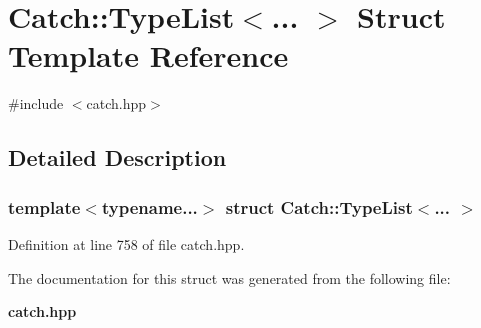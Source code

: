 \section{Catch\+::Type\+List$<$... $>$ Struct Template Reference}
\label{struct_catch_1_1_type_list}


{\ttfamily \#include $<$catch.\+hpp$>$}



\subsection{Detailed Description}
\subsubsection*{template$<$typename...$>$\newline
struct Catch\+::\+Type\+List$<$... $>$}



Definition at line 758 of file catch.\+hpp.



The documentation for this struct was generated from the following file\+:\begin{DoxyCompactItemize}
\item 
\textbf{ catch.\+hpp}\end{DoxyCompactItemize}

